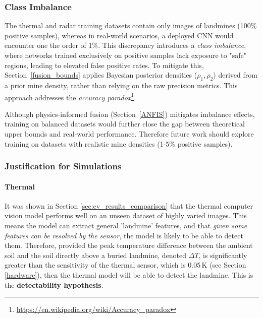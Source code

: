     \subsubsection{Class Imbalance} \label{class_imbalance}

        \noindent The thermal and radar training datasets contain only images of landmines (100\% positive samples), whereas in real-world scenarios, a deployed CNN would encounter one the order of 1\%. This discrepancy introduces a \textit{class imbalance}, where networks trained exclusively on positive samples lack exposure to "safe" regions, leading to elevated false positive rates. To mitigate this, Section~\ref{fusion_bounds} applies Bayesian posterior densities (\(\rho_1, \rho_2\)) derived from a prior mine density, rather than relying on the raw precision metrics. This approach addresses the \textit{accuracy paradox}\footnote{\url{https://en.wikipedia.org/wiki/Accuracy_paradox}}.

        \noindent Although physics-informed fusion (Section~\ref{ANFIS}) mitigates imbalance effects, training on balanced datasets would further close the gap between theoretical upper bounds and real-world performance. Therefore future work should explore training on datasets with realistic mine densities (1-5\% positive samples).

        
    \subsubsection{Justification for Simulations} \label{simulation_justification}
    
    
        \paragraph{Thermal} 
        
            
           It was shown in Section \ref{sec:cv_results_comparison} that the thermal computer vision model performs well on an unseen dataset of highly varied images. This means the model can extract general 'landmine' features, and that \textit{given some features can be resolved by the sensor}, the model is likely to be able to detect them. Therefore, provided the peak temperature difference between the ambient soil and the soil directly above a buried landmine, denoted \(\Delta T\), is significantly greater than the sensitivity of the thermal sensor, which is 0.05\,K (see Section \ref{hardware}), then the thermal model will be able to detect the landmine. This is the \textbf{detectability hypothesis}.

